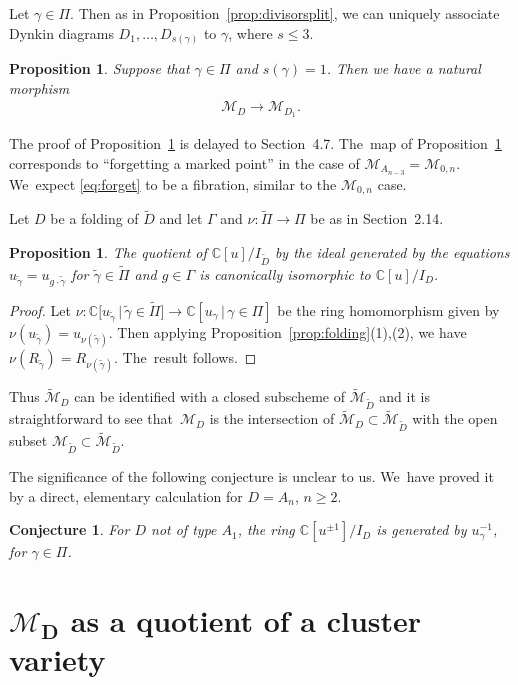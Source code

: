 \documentclass[10pt,a4paper]{amsart}
\def\C{{\mathbb C}}
\def\M{{\mathcal{M}}}
\def\tM{{\widetilde {\mathcal{M}}}}
\def\tD{{\tilde D}}
\def\tgamma{{\tilde \gamma}}
\def\tPi{{\tilde \Pi}}
\numberwithin{equation}{section}
\newtheorem{Proposition}[Theorem]{Proposition}
\newtheorem{Conjecture}[Theorem]{Conjecture}
 { \theoremstyle{definition}
\newtheorem{Definition}[Theorem]{Definition}
\newtheorem{Example}[Theorem]{Example}
\newtheorem{Remark}[Theorem]{Remark}
\newtheorem{question}[Theorem]{Question}
\newtheorem{problem}[Theorem]{Problem}}
\begin{document}
\bigskip{}
Let $\gamma \in \Pi$. Then as in Proposition~\ref{prop:divisorsplit}, we can uniquely associate Dynkin diagrams $D_1,\dots,D_{s(\gamma)}$ to $\gamma$, where $s \leq 3$.

\begin{Proposition}\label{prop:forget}
Suppose that $\gamma \in \Pi$ and $s(\gamma) = 1$. Then we have a natural morphism
\begin{gather}\label{eq:forget}
\M_{D} \longrightarrow \M_{D_1}.
\end{gather}
\end{Proposition}
The proof of Proposition~\ref{prop:forget} is delayed to Section~4.7. The~map of Proposition~\ref{prop:forget} corresponds to ``forgetting a marked point'' in the case of $\M_{A_{n-3}} = \M_{0,n}$. We~expect \eqref{eq:forget} to be a fibration, similar to the $\M_{0,n}$ case.

\bigskip{}
Let $D$ be a folding of $\tD$ and let $\Gamma$ and $\nu\colon \tPi \to \Pi$ be as in Section~2.14.

\begin{Proposition}
The quotient of $\C[u]/I_{\tD}$ by the ideal generated by the equations $u_{\tgamma} = u_{g \cdot \tgamma}$ for $\tgamma \in \tPi$ and $g \in \Gamma$ is canonically isomorphic to $\C[u]/I_D$.
\end{Proposition}
\begin{proof}
Let $\nu\colon \C\big[u_{\tgamma}\,|\, \tgamma \in \tPi\big] \to \C[u_{\gamma}\,|\, \gamma \in \Pi]$ be the ring homomorphism given by $\nu(u_{\tgamma}) \allowbreak = u_{\nu(\tgamma)}$. Then applying Proposition~\ref{prop:folding}(1),(2), we have $\nu(R_{\tgamma}) = R_{\nu(\tgamma)}$. The~result follows.
\end{proof}
Thus $\tM_{D}$ can be identified with a closed subscheme of $\tM_{\tD}$ and it is straightforward to see that~$\M_{D}$ is the intersection of $\tM_{D} \subset \tM_{\tD}$ with the open subset $\M_{\tD} \subset \tM_{\tD}$.

\bigskip{}
The significance of the following conjecture is unclear to us. We~have proved it by a direct, elementary calculation for $D= A_n$, $n \geq 2$.
\begin{Conjecture}
For $D$ not of type $A_1$, the ring $\C[u^{\pm 1}]/I_D$ is generated by $u_\gamma^{-1}$, for $\gamma \in \Pi$.
\end{Conjecture}


\section[MD as a quotient of a cluster variety]
{$\boldsymbol{\M_D}$ as a quotient of a cluster variety}\label{sec:quotient}
\end{document}
